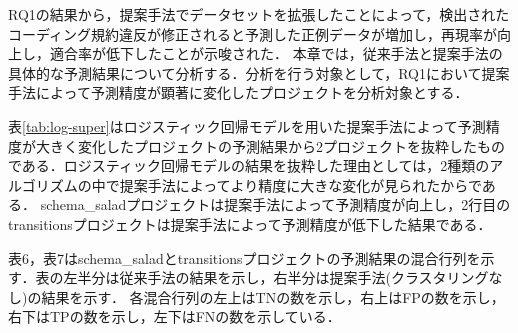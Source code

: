 \documentclass[submit,noauthor,ses,dvipdfmx]{ipsj}
\newcommand{\todo}[1]{\colorbox{yellow}{{\bf TODO}:}{\color{red} {\textbf{[#1]}}}}
\begin{document}


RQ1の結果から，提案手法でデータセットを拡張したことによって，検出されたコーディング規約違反が修正されると予測した正例データが増加し，再現率が向上し，適合率が低下したことが示唆された．
本章では，従来手法と提案手法の具体的な予測結果について分析する．分析を行う対象として，RQ1において提案手法によって予測精度が顕著に変化したプロジェクトを分析対象とする．

表\ref{tab:log-super}はロジスティック回帰モデルを用いた提案手法によって予測精度が大きく変化したプロジェクトの予測結果から2プロジェクトを抜粋したものである．ロジスティック回帰モデルの結果を抜粋した理由としては，2種類のアルゴリズムの中で提案手法によってより精度に大きな変化が見られたからである．
schema\_saladプロジェクトは提案手法によって予測精度が向上し，2行目のtransitionsプロジェクトは提案手法によって予測精度が低下した結果である．

表6，表7はschema\_saladとtransitionsプロジェクトの予測結果の混合行列を示す．表の左半分は従来手法の結果を示し，右半分は提案手法(クラスタリングなし)の結果を示す．
各混合行列の左上はTNの数を示し，右上はFPの数を示し，右下はTPの数を示し，左下はFNの数を示している．

\end{document}
